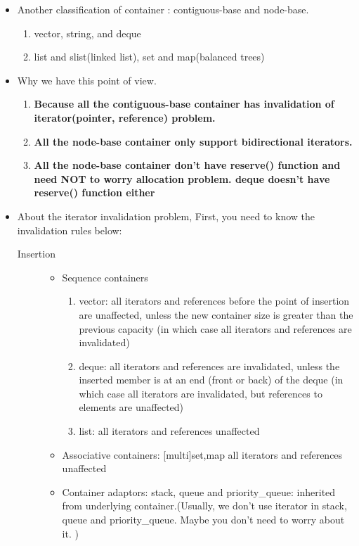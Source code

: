 \documentclass[a4paper,11pt,twoside]{book}
\begin{document}
\begin{itemize}
\item Another classification of container : contiguous-base and node-base.
\begin{enumerate}
\item vector, string, and deque
\item list and slist(linked list), set and map(balanced trees)
\end{enumerate}

\item Why we have this point of view.
\begin{enumerate}
\item \textbf{Because all the contiguous-base container has invalidation of iterator(pointer, reference) problem. }
\item \textbf{All the node-base container only support bidirectional iterators. }
\item \textbf{All the node-base container don't have reserve() function and need NOT to worry allocation problem. deque doesn't have reserve() function either }
\end{enumerate}

\item About the iterator invalidation problem,  First, you need to know the invalidation rules below:
\begin{description}
\item[Insertion]
\begin{itemize}
\item Sequence containers
		\begin{enumerate}
		\item vector: all iterators and references before the point of insertion are unaffected, unless the new container size is greater than the previous capacity (in which case all iterators and references are invalidated)
		\item deque: all iterators and references are invalidated, unless the inserted member is at an end (front or back) of the deque (in which case all iterators are invalidated, but references to elements are unaffected)
		\item list: all iterators and references unaffected
		\end{enumerate}

\item Associative containers: [multi]{set,map} all iterators and references unaffected

\item Container adaptors:  stack, queue and priority\_queue: inherited from underlying container.(Usually, we don't use iterator in stack, queue and priority\_queue. Maybe you don't need to worry about it. )
\end{itemize}


\end{description}
\end{itemize}
\end{document}
